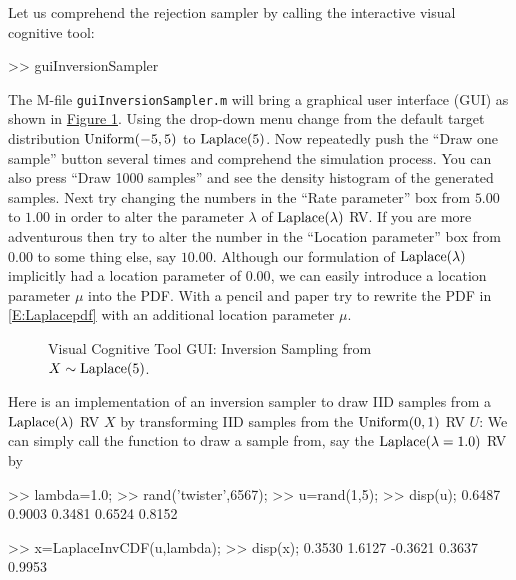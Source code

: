 \begin{labwork}\label{LW:guiInversionSamplerLaplace}
Let us comprehend the rejection sampler by calling the interactive visual cognitive tool:
\begin{VrbM}
>> guiInversionSampler
\end{VrbM}
The M-file {\tt guiInversionSampler.m} will bring a graphical user interface (GUI) as shown in \hyperref[F:guiInversionSamplerLaplace]{Figure \ref*{F:guiInversionSamplerLaplace}}.  Using the drop-down menu change from the default target distribution $\mbox{{\rm Uniform}}(-5,5)$ to $\mbox{{\rm Laplace}}(5)$.  Now repeatedly push the ``Draw one sample'' button several times and comprehend the simulation process.  You can also press ``Draw 1000 samples'' and see the density histogram of the generated samples.  
Next try changing the numbers in the ``Rate parameter'' box from $5.00$ to $1.00$ in order to alter the parameter $\lambda$ of $\laplace(\lambda)$ RV.  If you are more adventurous then try to alter the number in the ``Location parameter'' box from $0.00$ to some thing else, say $10.00$.  Although our formulation of $\laplace(\lambda)$ implicitly had a location parameter of $0.00$, we can easily introduce a location parameter $\mu$ into the PDF.  With a pencil and paper try to rewrite the PDF in \eqref{E:Laplacepdf} with an additional location parameter $\mu$.
\end{labwork}

\begin{figure}[htpb]
\caption{Visual Cognitive Tool GUI: Inversion Sampling from $X \sim \mbox{{\rm Laplace}}(5)$.\label{F:guiInversionSamplerLaplace}}
\centering   {}
\end{figure}

\begin{simulation}[$\laplace(\lambda)$] \label{SIM:Laplace}
Here is an implementation of an inversion sampler to draw IID samples from a $\laplace(\lambda)$ RV $X$ by transforming IID samples from the $\mbox{{\rm Uniform}}(0,1)$ RV $U$:
We can simply call the function to draw a sample from, say the $\mbox{{\rm Laplace}}(\lambda=1.0)$ RV by
\begin{VrbM}
>> lambda=1.0;		%
>> rand('twister',6567);        %
>> u=rand(1,5);		%
>> disp(u);		%
    0.6487    0.9003    0.3481    0.6524    0.8152

>> x=LaplaceInvCDF(u,lambda); %
>> disp(x);                     %
    0.3530    1.6127   -0.3621    0.3637    0.9953
\end{VrbM}
\end{simulation}

